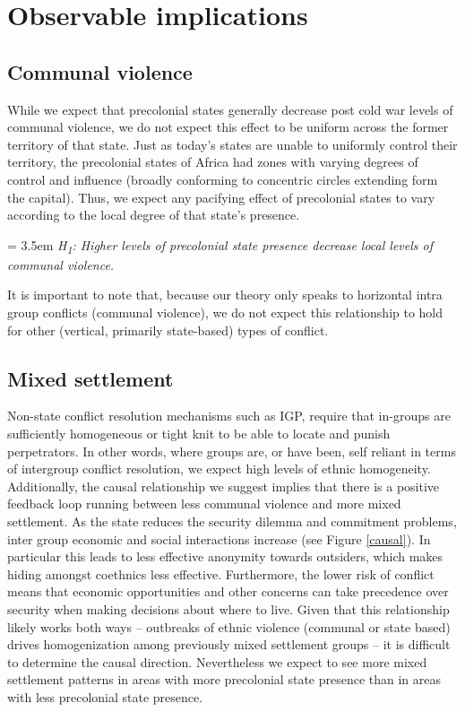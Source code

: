 \section{Observable implications} \label{Observable implications}

\subsection{Communal violence} \label{Communal violence}

While we expect that precolonial states generally decrease post cold war levels
of communal violence, we do not expect this effect to be uniform across the
former territory of that state. Just as today's states are unable to uniformly
control their territory, the precolonial states of Africa had zones with varying
degrees of control and influence (broadly conforming to concentric circles
extending form the capital). Thus, we expect any pacifying effect of precolonial
states to vary according to the local degree of that state's presence.

\bigskip
\hangindent = 3.5em \textit{H\textsubscript{1}: Higher levels of precolonial
	state presence decrease local levels of communal violence.}
\bigskip

It is important to note that, because our theory only speaks to horizontal intra
group conflicts (communal violence), we do not expect this relationship to hold
for other (vertical, primarily state-based) types of conflict. 

\subsection{Mixed settlement} \label{Mixed settlement}

Non-state conflict resolution mechanisms such as IGP, require that in-groups are
sufficiently homogeneous or tight knit to be able to locate and punish
perpetrators. In other words, where groups are, or have been, self reliant in
terms of intergroup conflict resolution, we expect high levels of ethnic
homogeneity. Additionally, the causal relationship we suggest implies that there
is a positive feedback loop running between less communal violence and more
mixed settlement. As the state reduces the security dilemma and commitment
problems, inter group economic and social interactions increase (see Figure
\ref{causal}). In particular this leads to less effective anonymity towards
outsiders, which makes hiding amongst coethnics less effective. Furthermore, the
lower risk of conflict means that economic opportunities and other concerns can
take precedence over security when making decisions about where to live. Given
that this relationship likely works both ways -- outbreaks of ethnic violence
(communal or state based) drives homogenization among previously mixed
settlement groups -- it is difficult to determine the causal direction.
Nevertheless we expect to see more mixed settlement patterns in areas with more
precolonial state presence than in areas with less precolonial state presence.

